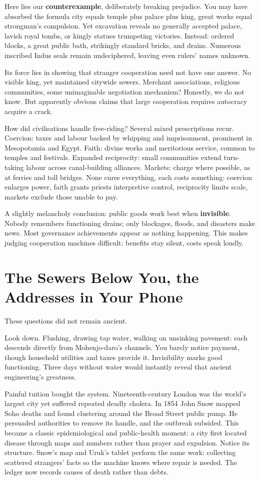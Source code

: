 Here lies our \textbf{counterexample}, deliberately breaking prejudice. You may have absorbed the formula city equals temple plus palace plus king, great works equal strongman's compulsion. Yet excavation reveals no generally accepted palace, lavish royal tombs, or kingly statues trumpeting victories. Instead: ordered blocks, a great public bath, strikingly standard bricks, and drains. Numerous inscribed Indus seals remain undeciphered, leaving even rulers' names unknown.

Its force lies in showing that stranger cooperation need not have one answer. No visible king, yet maintained citywide sewers. Merchant associations, religious communities, some unimaginable negotiation mechanism? Honestly, we do not know. But apparently obvious claims that large cooperation requires autocracy acquire a crack.

How did civilisations handle free-riding? Several mixed prescriptions recur. Coercion: taxes and labour backed by whipping and imprisonment, prominent in Mesopotamia and Egypt. Faith: divine works and meritorious service, common to temples and festivals. Expanded reciprocity: small communities extend turn-taking labour across canal-building alliances. Markets: charge where possible, as at ferries and toll bridges. None cures everything, each costs something: coercion enlarges power, faith grants priests interpretive control, reciprocity limits scale, markets exclude those unable to pay.

A slightly melancholy conclusion: public goods work best when \textbf{invisible}. Nobody remembers functioning drains; only blockages, floods, and disasters make news. Most governance achievements appear as nothing happening. This makes judging cooperation machines difficult: benefits stay silent, costs speak loudly.

\section[Sewers Below, Addresses in Your Phone]{The Sewers Below You, the Addresses in Your Phone}
These questions did not remain ancient.

Look down. Flushing, drawing tap water, walking on unsinking pavement: each descends directly from Mohenjo-daro's channels. You barely notice payment, though household utilities and taxes provide it. Invisibility marks good functioning. Three days without water would instantly reveal that ancient engineering's greatness.

Painful tuition bought the system. Nineteenth-century London was the world's largest city yet suffered repeated deadly cholera. In 1854 John Snow mapped Soho deaths and found clustering around the Broad Street public pump. He persuaded authorities to remove its handle, and the outbreak subsided. This became a classic epidemiological and public-health moment: a city first located disease through maps and numbers rather than prayer and expulsion. Notice its structure. Snow's map and Uruk's tablet perform the same work: collecting scattered strangers' facts so the machine knows where repair is needed. The ledger now records causes of death rather than debts.

